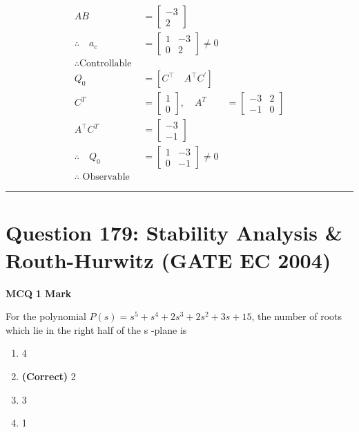 \documentclass[11pt,a4paper]{article}
\begin{document}
\begin{tcolorbox}[solbox, title=Detailed Solution -- Question 178]
\[
\begin{aligned} A B&=\left[\begin{array}{c}-3 \\ 2\end{array}\right] \\ \therefore \quad a_{c}&=\left[\begin{array}{cc}1 & -3 \\ 0 & 2\end{array}\right] \neq 0 \\ \therefore \text{Controllable } \\ Q_{0}&=\left[C^{\top} \quad A^{\top} C^{\prime}\right] \\ C^{T}&=\left[\begin{array}{l}1 \\ 0\end{array}\right], \quad A^{T}&=\left[\begin{array}{ll}-3 & 2 \\ -1 & 0\end{array}\right] \\ A^{\top} C^{T}&=\left[\begin{array}{l}-3 \\ -1\end{array}\right] \\ \therefore \quad Q_{0}&=\left[\begin{array}{ll}1 & -3 \\ 0 & -1\end{array}\right] \neq 0 \\ \therefore \text{ Observable} \end{aligned}
\]
\end{tcolorbox}

\vspace{1.5em}
\hrule
\vspace{1.5em}

\section*{Question 179: Stability Analysis \& Routh-Hurwitz (GATE EC 2004)}
\noindent \textbf{\color{primary}MCQ} \hfill \textbf{\color{secondary}1 Mark}


\noindent For the polynomial $P(s)=s^{5}+s^{4}+2s^{3}+2s^{2}+3s+15$, the number of roots
which lie in the right half of the s -plane is


\begin{enumerate}[label=(\Alph*)]
    \item 4
    \item \textbf{(Correct)} 2
    \item 3
    \item 1
\end{enumerate}
\end{document}
